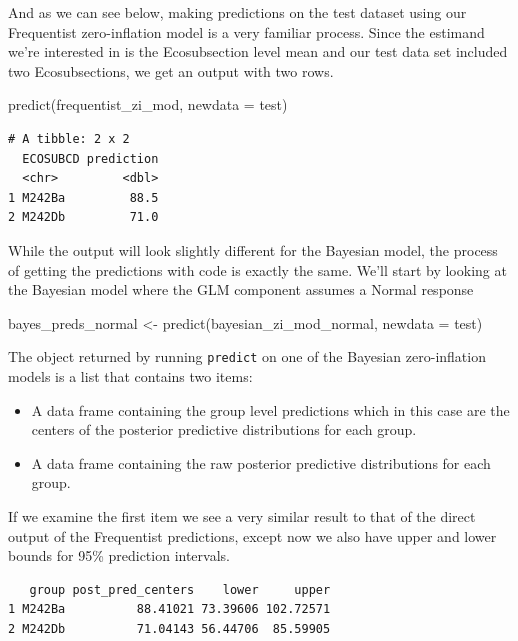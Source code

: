 \documentclass[12pt,twoside]{reedthesis}
\newenvironment{Shaded}{\begin{snugshade}}{\end{snugshade}}
\newcommand{\AttributeTok}[1]{\textcolor[rgb]{0.77,0.63,0.00}{#1}}
\newcommand{\FunctionTok}[1]{\textcolor[rgb]{0.00,0.00,0.00}{#1}}
\newcommand{\NormalTok}[1]{#1}
\newcommand{\OtherTok}[1]{\textcolor[rgb]{0.56,0.35,0.01}{#1}}
\newcommand{\SpecialCharTok}[1]{\textcolor[rgb]{0.00,0.00,0.00}{#1}}
\providecommand{\tightlist}{%
  \setlength{\itemsep}{0pt}\setlength{\parskip}{0pt}}
\begin{document}
And as we can see below, making predictions on the test dataset using our Frequentist zero-inflation model is a very familiar process. Since the estimand we're interested in is the Ecosubsection level mean and our test data set included two Ecosubsections, we get an output with two rows.
\begin{Shaded}
\begin{Highlighting}[]
\FunctionTok{predict}\NormalTok{(frequentist\_zi\_mod, }\AttributeTok{newdata =}\NormalTok{ test)}
\end{Highlighting}
\end{Shaded}
\begin{verbatim}
# A tibble: 2 x 2
  ECOSUBCD prediction
  <chr>         <dbl>
1 M242Ba         88.5
2 M242Db         71.0
\end{verbatim}
While the output will look slightly different for the Bayesian model, the process of getting the predictions with code is exactly the same. We'll start by looking at the Bayesian model where the GLM component assumes a Normal response
\begin{Shaded}
\begin{Highlighting}[]
\NormalTok{bayes\_preds\_normal }\OtherTok{\textless{}{-}} \FunctionTok{predict}\NormalTok{(bayesian\_zi\_mod\_normal, }\AttributeTok{newdata =}\NormalTok{ test)}
\end{Highlighting}
\end{Shaded}
The object returned by running \texttt{predict} on one of the Bayesian zero-inflation models is a list that contains two items:
\begin{itemize}
\tightlist
\item
  A data frame containing the group level predictions which in this case are the centers of the posterior predictive distributions for each group.
\item
  A data frame containing the raw posterior predictive distributions for each group.
\end{itemize}
If we examine the first item we see a very similar result to that of the direct output of the Frequentist predictions, except now we also have upper and lower bounds for 95\% prediction intervals.
\begin{Shaded}
\end{Shaded}
\begin{verbatim}
   group post_pred_centers    lower     upper
1 M242Ba          88.41021 73.39606 102.72571
2 M242Db          71.04143 56.44706  85.59905
\end{verbatim}
\end{document}
